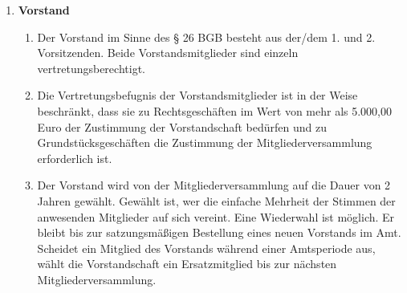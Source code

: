 \documentclass{article}
\begin{document}
\begin{enumerate}[§ 1.]
\item \textsf{\textbf{Vorstand}}
	\begin{enumerate}[1.]
	\item Der Vorstand im Sinne des § 26 BGB besteht aus der/dem 1. und 2. Vorsitzenden.
Beide Vorstandsmitglieder sind einzeln vertretungsberechtigt.
	\item Die Vertretungsbefugnis der Vorstandsmitglieder ist in der Weise beschränkt, dass sie zu Rechtsgeschäften im Wert von mehr als 5.000,00 Euro der Zustimmung der Vorstandschaft bedürfen und zu Grundstücksgeschäften die Zustimmung der Mitgliederversammlung erforderlich ist.
	\item Der Vorstand wird von der Mitgliederversammlung auf die Dauer von 2 Jahren gewählt. Gewählt ist, wer die einfache Mehrheit der Stimmen der anwesenden Mitglieder auf sich vereint. Eine Wiederwahl ist möglich. Er bleibt bis zur satzungsmäßigen Bestellung eines neuen Vorstands im Amt. Scheidet ein Mitglied des Vorstands während einer Amtsperiode aus, wählt die Vorstandschaft ein Ersatzmitglied bis zur nächsten Mitgliederversammlung.
	\end{enumerate}


\end{enumerate}
\end{document}
